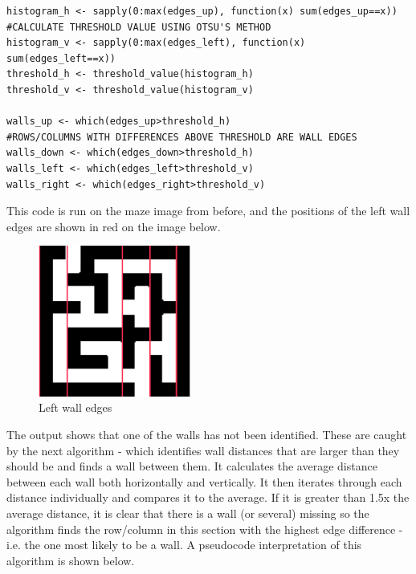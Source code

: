 \documentclass[titlepage]{article}
\begin{document}
\begin{changemargin}{-1in}{-1in} 
\begin{verbatim}
histogram_h <- sapply(0:max(edges_up), function(x) sum(edges_up==x))            #CALCULATE THRESHOLD VALUE USING OTSU'S METHOD
histogram_v <- sapply(0:max(edges_left), function(x) sum(edges_left==x))
threshold_h <- threshold_value(histogram_h)
threshold_v <- threshold_value(histogram_v)

walls_up <- which(edges_up>threshold_h)                                         #ROWS/COLUMNS WITH DIFFERENCES ABOVE THRESHOLD ARE WALL EDGES
walls_down <- which(edges_down>threshold_h)
walls_left <- which(edges_left>threshold_v)
walls_right <- which(edges_right>threshold_v)
\end{verbatim}
\end{changemargin} 

This code is run on the maze image from before, and the positions of the left wall edges are shown in red on the image below.

\begin{figure}[H]
  \centering
  \includegraphics[width=5cm]{walls.png}
  \caption{Left wall edges}
  \label{fig:dijk}
\end{figure}

The output shows that one of the walls has not been identified. These are caught by the next algorithm - which identifies wall distances that are larger than they should be and finds a wall between them. It calculates the average distance between each wall both horizontally and vertically. It then iterates through each distance individually and compares it to the average. If it is greater than 1.5x the average distance, it is clear that there is a wall (or several) missing so the algorithm finds the row/column in this section with the highest edge difference - i.e. the one most likely to be a wall. A pseudocode interpretation of this algorithm is shown below.
\end{document}
